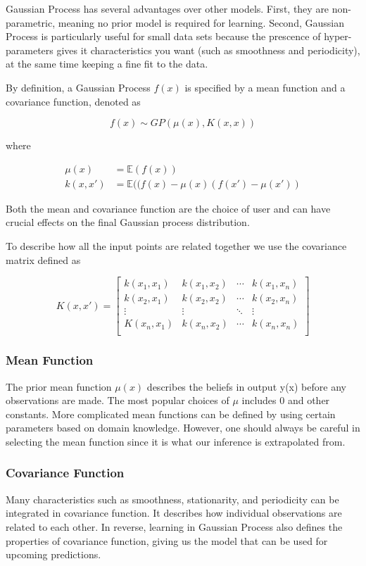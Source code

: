 \documentclass[14pt]{report}
\numberwithin{equation}{chapter}
\begin{document}
\begin{spacing}{2}
Gaussian Process has several advantages over other models. First, they are non-parametric, meaning no prior model is required for learning. Second, Gaussian Process is particularly useful for small data sets because the prescence of hyper-parameters gives it characteristics you want (such as smoothness and periodicity), at the same time keeping a fine fit to the data.  

By definition, a Gaussian Process $f(x)$ is specified by a mean function and a covariance function, denoted as  

\[f(x) \sim GP(\mu(x),K(x,x))\]

where

\begin{align}
\mu(x) &= \mathbb{E}(f(x))\\
k(x,x\prime) &= \mathbb{E}((f(x) - \mu(x)(f(x\prime) - \mu(x\prime)) 
\end{align}

Both the mean and covariance function are the choice of user and can have crucial effects on the final Gaussian process distribution.

To describe how all the input points are related together we use the covariance matrix defined as 

\begin{equation}
K(x,x\prime) = \left[\begin{array}{cccc}
k(x_1,x_1) & k(x_1,x_2) & \cdots & k(x_1,x_n)\\
k(x_2,x_1) & k(x_2,x_2) & \cdots & k(x_2,x_n)\\
\vdots & \vdots & \ddots & \vdots\\
K(x_n,x_1) & k(x_n,x_2) & \cdots & k(x_n,x_n)\\

\end{array}\right]
\end{equation}

\subsubsection{Mean Function}
The prior mean function $\mu(x)$ describes the beliefs in output y(x) before any observations are made. The most popular choices of $\mu$ includes 0 and other constants. More complicated mean functions can be defined by using certain parameters based on domain knowledge. However, one should always be careful in selecting the mean function since it is what our inference is extrapolated from.   

\subsubsection{Covariance Function}
Many characteristics such as smoothness, stationarity, and periodicity can be integrated in covariance function. It describes how individual observations are related to each other. In reverse, learning in Gaussian Process also defines the properties of covariance function, giving us the model that can be used for upcoming predictions.   


\end{spacing}
\end{document}
